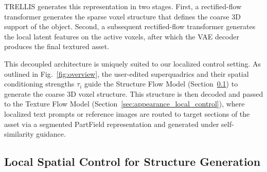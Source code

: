 TRELLIS generates this representation in two stages. First, a rectified-flow transformer generates the sparse voxel structure that defines the coarse 3D support of the object. Second, a subsequent rectified-flow transformer generates the local latent features on the active voxels, after which the VAE decoder produces the final textured asset. 


This decoupled architecture is uniquely suited to our localized control setting. As outlined in Fig.~\ref{fig:overview}, the user-edited superquadrics and their spatial conditioning strengths $\tau_i$ guide the Structure Flow Model (Section~\ref{sec:spatial_local_control}) to generate the coarse 3D voxel structure. This structure is then decoded and passed to the Texture Flow Model (Section~\ref{sec:appearance_local_control}), where localized text prompts or reference images are routed to target sections of the asset via a segmented PartField representation and generated under self-similarity guidance.

\subsection{Local Spatial Control for Structure Generation}
\label{sec:spatial_local_control}

